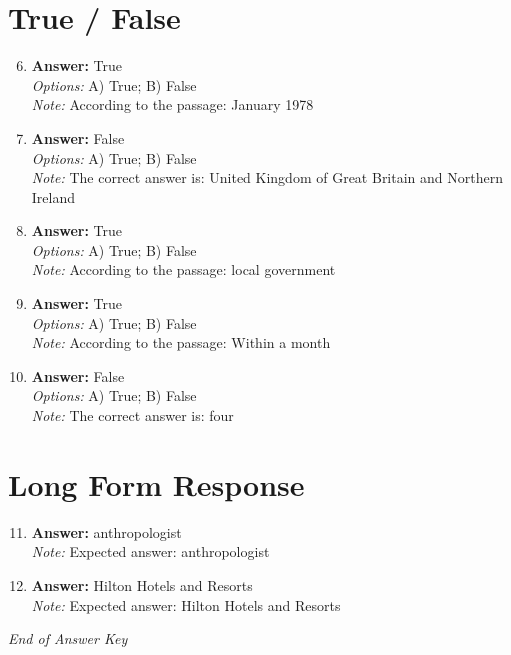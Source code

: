\documentclass[12pt]{article}
\begin{document}
\section*{True / False}
\begin{enumerate}[label=\arabic*.]
\setcounter{enumi}{5}
\item \textbf{Answer:} True
\\ \textit{Options:} A) True; B) False
\\ \textit{Note:} According to the passage: January 1978
\item \textbf{Answer:} False
\\ \textit{Options:} A) True; B) False
\\ \textit{Note:} The correct answer is: United Kingdom of Great Britain and Northern Ireland
\item \textbf{Answer:} True
\\ \textit{Options:} A) True; B) False
\\ \textit{Note:} According to the passage: local government
\item \textbf{Answer:} True
\\ \textit{Options:} A) True; B) False
\\ \textit{Note:} According to the passage: Within a month
\item \textbf{Answer:} False
\\ \textit{Options:} A) True; B) False
\\ \textit{Note:} The correct answer is: four
\end{enumerate}

\section*{Long Form Response}
\begin{enumerate}[label=\arabic*.]
\setcounter{enumi}{10}
\item \textbf{Answer:} anthropologist
\\ \textit{Note:} Expected answer: anthropologist
\item \textbf{Answer:} Hilton Hotels and Resorts
\\ \textit{Note:} Expected answer: Hilton Hotels and Resorts
\end{enumerate}

\vfill
\noindent\textit{End of Answer Key}
\end{document}
